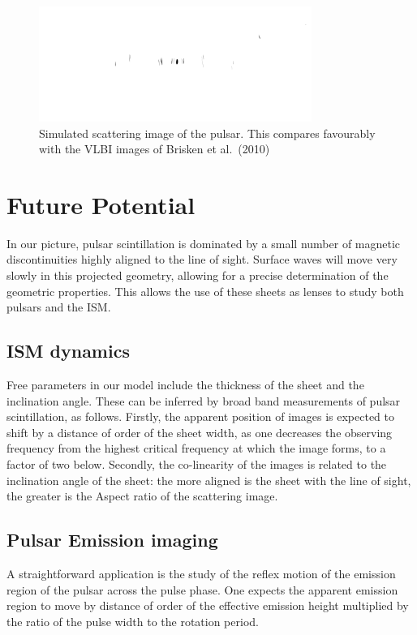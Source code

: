 \documentclass[useAMS,usenatbib]{mn2e}
\begin{document}
\begin{figure}
\centerline{\includegraphics[width=3.5in]{image86r.png}}
\caption{Simulated scattering image of the pulsar.  This
  compares favourably with the VLBI images of Brisken et al.~(2010)
}
\label{fig:2d}
\end{figure}

\section{Future Potential}

In our picture, pulsar scintillation is dominated by a small number of
magnetic discontinuities highly aligned to the line of sight.  Surface
waves will move very slowly in this projected geometry, allowing for a
precise determination of the geometric properties.  This allows the
use of these sheets as lenses to study both pulsars and the ISM.  

\subsection{ISM dynamics}

Free parameters in our model include the thickness of the sheet and the
inclination angle.  These can be inferred by broad band measurements
of pulsar scintillation, as follows. Firstly, the apparent position of images is expected to shift by
a distance of order of the sheet width, as one decreases the observing frequency from the
highest critical frequency at which the image forms, to a factor of
two below.  Secondly, the co-linearity of the images is related to
the inclination angle of the sheet: the more aligned is the sheet with the line of
sight, the greater is the Aspect ratio of the scattering image.

\subsection{Pulsar Emission imaging}

A straightforward application is the study of the reflex motion of the
emission region of the pulsar across the pulse phase.  One expects the
apparent emission region to move by distance of order of the effective emission height
multiplied by the ratio of the pulse width to the rotation period.
\end{document}
